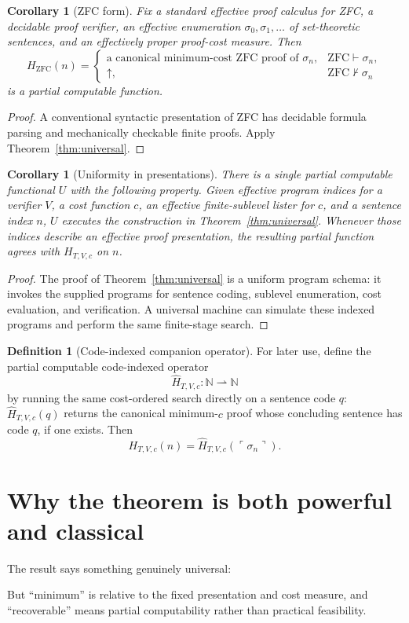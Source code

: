\documentclass[11pt,oneside]{book}
\newtheorem{corollary}[theorem]{Corollary}
\theoremstyle{definition}
\newtheorem{definition}[theorem]{Definition}
\theoremstyle{remark}
\newcommand{\N}{\mathbb{N}}
\newcommand{\code}[1]{\ulcorner #1\urcorner}
\newcommand{\diverges}{\mathord{\uparrow}}
\begin{document}
\begin{corollary}[ZFC form]\label{cor:zfc}
Fix a standard effective proof calculus for ZFC, a decidable proof verifier, an effective enumeration $\sigma_0,\sigma_1,\ldots$ of set-theoretic sentences, and an effectively proper proof-cost measure. Then
\[
H_{\mathrm{ZFC}}(n)=
\begin{cases}
\text{a canonical minimum-cost ZFC proof of }\sigma_n,&\mathrm{ZFC}\vdash\sigma_n,\\
\diverges,&\mathrm{ZFC}\nvdash\sigma_n
\end{cases}
\]
is a partial computable function.
\end{corollary}
\begin{proof}
A conventional syntactic presentation of ZFC has decidable formula parsing and mechanically checkable finite proofs. Apply Theorem~\ref{thm:universal}.
\end{proof}

\begin{corollary}[Uniformity in presentations]\label{cor:uniform}
There is a single partial computable functional $U$ with the following property. Given effective program indices for a verifier $V$, a cost function $c$, an effective finite-sublevel lister for $c$, and a sentence index $n$, $U$ executes the construction in Theorem~\ref{thm:universal}. Whenever those indices describe an effective proof presentation, the resulting partial function agrees with $H_{T,V,c}$ on $n$.
\end{corollary}
\begin{proof}
The proof of Theorem~\ref{thm:universal} is a uniform program schema: it invokes the supplied programs for sentence coding, sublevel enumeration, cost evaluation, and verification. A universal machine can simulate these indexed programs and perform the same finite-stage search.
\end{proof}

\begin{definition}[Code-indexed companion operator]\label{def:codeindexed}
For later use, define the partial computable code-indexed operator
\[
\widehat H_{T,V,c}:\N\rightharpoonup\N
\]
by running the same cost-ordered search directly on a sentence code $q$: $\widehat H_{T,V,c}(q)$ returns the canonical minimum-$c$ proof whose concluding sentence has code $q$, if one exists. Then
\[
H_{T,V,c}(n)=\widehat H_{T,V,c}(\code{\sigma_n}).
\]
\end{definition}

\section{Why the theorem is both powerful and classical}
The result says something genuinely universal:
\begin{center}
\end{center}
But ``minimum'' is relative to the fixed presentation and cost measure, and ``recoverable'' means partial computability rather than practical feasibility.
\end{document}
